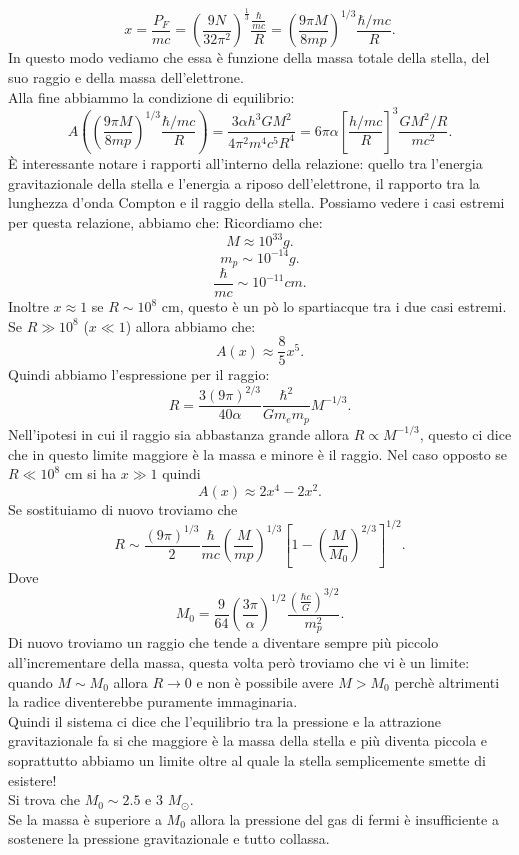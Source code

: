 \[
	x = \frac{P_{F}}{mc} = \left( \frac{9N}{32 \pi^2} \right) ^{\frac{1}{3}}
	\frac{\frac{\hbar}{mc}}{R} =
	\left( \frac{9\pi M}{8mp}\right)^{1 /3} \frac{\hbar /mc}{R} 
.\] 
In questo modo vediamo che essa è funzione della massa totale della stella, del suo raggio e della massa dell'elettrone.\\
Alla fine abbiammo la condizione di equilibrio:
\[
	A( \left( \frac{9\pi M}{8mp}\right)^{1 /3} \frac{\hbar /mc}{R} ) =
	\frac{3\alpha h^3GM^2}{4\pi^2m ^{4}c^{5}R^{4}} = 
	6\pi\alpha \left[ \frac{h /mc}{R} \right] ^3 \frac{GM^2 /R}{mc^2}
.\] 
È interessante notare i rapporti all'interno della relazione: quello tra l'energia gravitazionale della stella e l'energia a riposo dell'elettrone, il rapporto tra la lunghezza d'onda Compton e il raggio della stella. Possiamo vedere i casi estremi per questa relazione, abbiamo che:
Ricordiamo che:
\[
	M \approx 10^{33} g
.\] 
\[
	m_{p}\sim 10^{-14}g
.\] 
\[
	\frac{\hbar}{mc}\sim 10^{-11} cm
.\] 
Inoltre $x \approx 1$ se $R \sim 10^{8}$ cm, questo è un pò lo spartiacque tra i due casi estremi.\\
Se $R \gg 10^{8}$ ($x \ll 1$) allora abbiamo che:
\[
	A( x) \approx \frac{8}{5}x^{5}
.\] 
Quindi abbiamo l'espressione per il raggio:
\[
	R = \frac{3 \left( 9\pi \right) ^{2 /3}}{40\alpha }\frac{\hbar^2}{Gm_{e}m_{p}}M^{-1 /3}
.\] 
Nell'ipotesi in cui il raggio sia abbastanza grande allora $R \propto M^{-1 /3}$, questo ci dice che in questo limite maggiore è la massa e minore è il raggio.
Nel caso opposto se $R \ll 10^{8}$ cm si ha $x \gg 1$ quindi 
\[
	A( x)  \approx 2x^{4} - 2 x^2
.\] Se sostituiamo di nuovo troviamo che
\[
	R \sim \frac{\left( 9\pi \right) ^{1 /3}}{2} \frac{\hbar}{mc} \left( \frac{M}{mp} \right) ^{1 /3} \left[ 1- \left( \frac{M}{M_0} \right) ^{2 /3} \right] ^{1 /2}
.\] 
Dove 
 \[
	 M_0 = \frac{9}{64} \left( \frac{3\pi}{\alpha } \right) ^{1 /2} \frac{\left( \frac{\hbar c}{G} \right) ^{3 /2}}{m_{p}^2}
.\] 
Di nuovo troviamo un raggio che tende a diventare sempre più piccolo all'incrementare della massa, questa volta però troviamo che vi è un limite: quando $M \sim M_0$ allora $R \to 0$ e non è possibile avere $M > M_0$ perchè altrimenti la radice diventerebbe puramente immaginaria.\\
Quindi il sistema ci dice che l'equilibrio tra la pressione e la attrazione gravitazionale fa si che maggiore è la massa della stella e più diventa piccola e soprattutto abbiamo un limite oltre al quale la stella semplicemente smette di esistere!\\
Si trova che $M_0 \sim 2.5 $ e $3$ $M_{\odot}$. \\
Se la massa è superiore a $M_0$ allora la pressione del gas di fermi è insufficiente a sostenere la pressione gravitazionale e tutto collassa.
